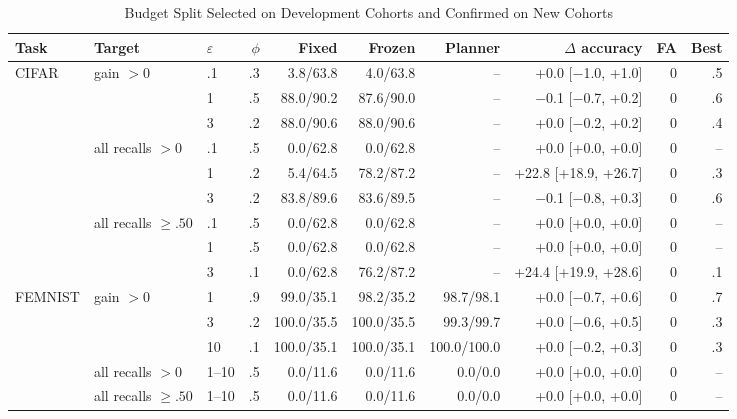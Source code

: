 \begin{table}[t]
\caption{Budget Split Selected on Development Cohorts and Confirmed on New Cohorts}
\label{tab:budgetconf}\small\setlength{\tabcolsep}{4pt}
\centering
\begin{tabular}{@{}lllrrrrrrr@{}}\toprule
Task & Target & $\varepsilon$ & $\phi$ & Fixed & Frozen & Planner & $\Delta$ accuracy & FA & Best \\
\midrule
CIFAR & gain $>0$ & .1 & .3 & 3.8/63.8 & 4.0/63.8 & -- & +0.0 [$-$1.0, +1.0] & 0 & .5 \\
 &  & 1 & .5 & 88.0/90.2 & 87.6/90.0 & -- & $-$0.1 [$-$0.7, +0.2] & 0 & .6 \\
 &  & 3 & .2 & 88.0/90.6 & 88.0/90.6 & -- & +0.0 [$-$0.2, +0.2] & 0 & .4 \\
 & all recalls $>0$ & .1 & .5 & 0.0/62.8 & 0.0/62.8 & -- & +0.0 [+0.0, +0.0] & 0 & -- \\
 &  & 1 & .2 & 5.4/64.5 & 78.2/87.2 & -- & +22.8 [+18.9, +26.7] & 0 & .3 \\
 &  & 3 & .2 & 83.8/89.6 & 83.6/89.5 & -- & $-$0.1 [$-$0.8, +0.3] & 0 & .6 \\
 & all recalls $\ge.50$ & .1 & .5 & 0.0/62.8 & 0.0/62.8 & -- & +0.0 [+0.0, +0.0] & 0 & -- \\
 &  & 1 & .5 & 0.0/62.8 & 0.0/62.8 & -- & +0.0 [+0.0, +0.0] & 0 & -- \\
 &  & 3 & .1 & 0.0/62.8 & 76.2/87.2 & -- & +24.4 [+19.9, +28.6] & 0 & .1 \\
\midrule
FEMNIST & gain $>0$ & 1 & .9 & 99.0/35.1 & 98.2/35.2 & 98.7/98.1 & +0.0 [$-$0.7, +0.6] & 0 & .7 \\
 &  & 3 & .2 & 100.0/35.5 & 100.0/35.5 & 99.3/99.7 & +0.0 [$-$0.6, +0.5] & 0 & .3 \\
 &  & 10 & .1 & 100.0/35.1 & 100.0/35.1 & 100.0/100.0 & +0.0 [$-$0.2, +0.3] & 0 & .3 \\
 & all recalls $>0$ & 1--10 & .5 & 0.0/11.6 & 0.0/11.6 & 0.0/0.0 & +0.0 [+0.0, +0.0] & 0 & -- \\
 & all recalls $\ge.50$ & 1--10 & .5 & 0.0/11.6 & 0.0/11.6 & 0.0/0.0 & +0.0 [+0.0, +0.0] & 0 & -- \\
\bottomrule\end{tabular}
\end{table}
